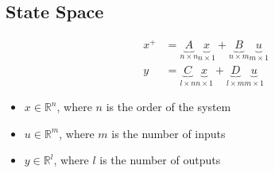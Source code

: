 \subsection{State Space}
\begin{align*}
    x^+ &= \underbrace{A}_{n \times n} \underbrace{x}_{n \times 1} + \underbrace{B}_{n \times m} \underbrace{u}_{m \times 1}\\
    y &= \underbrace{C}_{l \times n} \underbrace{x}_{n \times 1} + \underbrace{D}_{l \times m} \underbrace{u}_{m \times 1}
\end{align*}
\begin{itemize}
    \item $x \in \mathbb{R}^n$, where $n$ is the order of the system
    \item $u \in \mathbb{R}^m$, where $m$ is the number of inputs
    \item $y \in \mathbb{R}^l$, where $l$ is the number of outputs
\end{itemize}